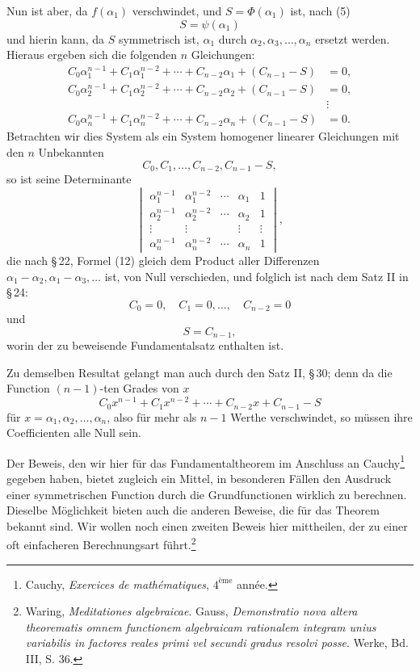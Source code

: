 \documentclass[11pt]{article}
\begin{document}
Nun ist aber, da \(f(\alpha_1)\) verschwindet, und \(S=\Phi(\alpha_1)\) ist, nach (5)
\begin{equation}
 S=\psi(\alpha_1)
\tag{7}
\end{equation}
und hierin kann, da \(S\) symmetrisch ist, \(\alpha_1\) durch \(\alpha_2,\alpha_3,\ldots,\alpha_n\) ersetzt werden. Hieraus ergeben sich die folgenden \(n\) Gleichungen:
\[
\begin{aligned}
 C_0\alpha_1^{n-1}+C_1\alpha_1^{n-2}+\cdots+C_{n-2}\alpha_1+(C_{n-1}-S)&=0,\\
 C_0\alpha_2^{n-1}+C_1\alpha_2^{n-2}+\cdots+C_{n-2}\alpha_2+(C_{n-1}-S)&=0,\\
 &\vdots\\
 C_0\alpha_n^{n-1}+C_1\alpha_n^{n-2}+\cdots+C_{n-2}\alpha_n+(C_{n-1}-S)&=0.
\end{aligned}
\tag{8}
\]
Betrachten wir dies System als ein System homogener linearer Gleichungen mit den \(n\) Unbekannten
\[
 C_0,C_1,\ldots,C_{n-2},C_{n-1}-S,
\]
so ist seine Determinante
\[
\begin{vmatrix}
 \alpha_1^{n-1}&\alpha_1^{n-2}&\cdots&\alpha_1&1\\
 \alpha_2^{n-1}&\alpha_2^{n-2}&\cdots&\alpha_2&1\\
 \vdots&\vdots&&\vdots&\vdots\\
 \alpha_n^{n-1}&\alpha_n^{n-2}&\cdots&\alpha_n&1
\end{vmatrix},
\]
die nach \S\,22, Formel (12) gleich dem Product aller Differenzen \(\alpha_1-\alpha_2,\alpha_1-\alpha_3,\ldots\) ist, von Null verschieden, und folglich ist nach dem Satz II in \S\,24:
\[
 C_0=0,\quad C_1=0,\ldots,\quad C_{n-2}=0
\]
und
\begin{equation}
 S=C_{n-1},
\tag{9}
\end{equation}
worin der zu beweisende Fundamentalsatz enthalten ist.

Zu demselben Resultat gelangt man auch durch den Satz II, \S\,30; denn da die Function \((n-1)\)-ten Grades von \(x\)
\[
 C_0x^{n-1}+C_1x^{n-2}+\cdots+C_{n-2}x+C_{n-1}-S
\]
für \(x=\alpha_1,\alpha_2,\ldots,\alpha_n\), also für mehr als \(n-1\) Werthe verschwindet, so müssen ihre Coefficienten alle Null sein.

Der Beweis, den wir hier für das Fundamentaltheorem im Anschluss an Cauchy\footnote{Cauchy, \emph{Exercices de mathématiques}, \(4^{\text{ème}}\) année.} gegeben haben, bietet zugleich ein Mittel, in besonderen Fällen den Ausdruck einer symmetrischen Function durch die Grundfunctionen wirklich zu berechnen. Dieselbe Möglichkeit bieten auch die anderen Beweise, die für das Theorem bekannt sind. Wir wollen noch einen zweiten Beweis hier mittheilen, der zu einer oft einfacheren Berechnungsart führt.\footnote{Waring, \emph{Meditationes algebraicae}. Gauss, \emph{Demonstratio nova altera theorematis omnem functionem algebraicam rationalem integram unius variabilis in factores reales primi vel secundi gradus resolvi posse}. Werke, Bd. III, S. 36.}
\end{document}
